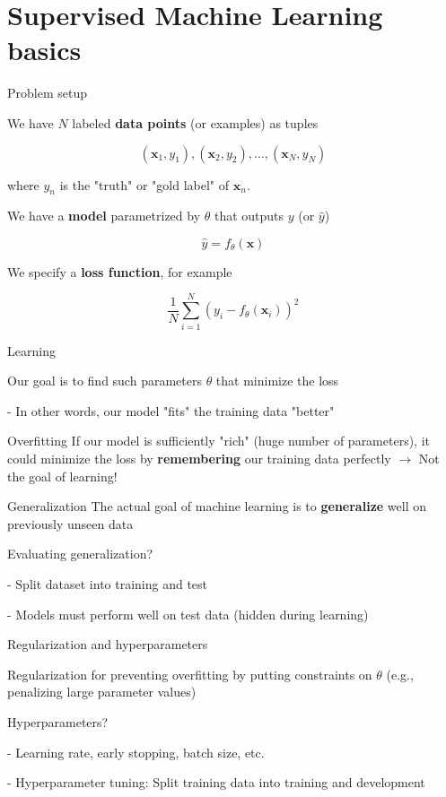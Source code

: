\documentclass[12pt]{beamer}
\begin{document}
\section{Supervised Machine Learning basics}

\begin{frame}{Problem setup}
	
We have $N$ labeled \textbf{data points} (or examples) as tuples

$$
(\mathbf{x}_1, y_1), (\mathbf{x}_2, y_2), \dots, (\mathbf{x}_N, y_N)
$$

where $y_n$ is the "truth" or "gold label" of $\mathbf{x}_n$.

We have a \textbf{model} parametrized by $\theta$ that outputs $y$ (or $\hat{y}$)

$$
\hat{y} = f_{\theta}(\mathbf{x})
$$
	
We specify a \textbf{loss function}, for example

$$
\frac{1}{N} \sum_{i = 1}^{N} \left( y_i - f_{\theta}(\mathbf{x}_i) \right)^2
$$
	
\end{frame}

\begin{frame}{Learning}
	
Our goal is to find such parameters $\theta$ that minimize the loss

- In other words, our model "fits" the training data "better"


\begin{block}{Overfitting}
If our model is sufficiently "rich" (huge number of parameters), it could minimize the loss by \textbf{remembering} our training data perfectly $\to$ Not the goal of learning!
\end{block}

	
\end{frame}


\begin{frame}{Generalization}
The actual goal of machine learning is to \textbf{generalize} well on previously unseen data

\bigskip

Evaluating generalization?

- Split dataset into training and test

- Models must perform well on test data (hidden during learning)

\end{frame}


\begin{frame}{Regularization and hyperparameters}

Regularization for preventing overfitting by putting constraints on $\theta$ (e.g., penalizing large parameter values)

\bigskip

Hyperparameters?

- Learning rate, early stopping, batch size, etc.

- Hyperparameter tuning: Split training data into training and development
	
\end{frame}
\end{document}
